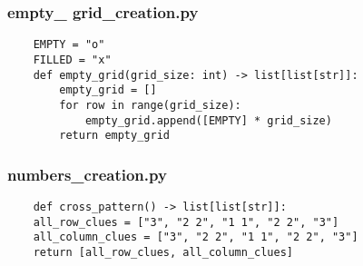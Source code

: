 \documentclass[14pt  aspectratio = 169]{beamer}
\begin{document}

\begin{frame}[fragile]
  \frametitle{empty\_ grid\_creation.py }
  \begin{lstlisting}
    EMPTY = "o"
    FILLED = "x"
    def empty_grid(grid_size: int) -> list[list[str]]:
        empty_grid = []
        for row in range(grid_size):
            empty_grid.append([EMPTY] * grid_size)
        return empty_grid

  \end{lstlisting}

\end{frame}

\begin{frame}[fragile]
  \frametitle{numbers\_creation.py }
  \begin{lstlisting}
    def cross_pattern() -> list[list[str]]:
	all_row_clues = ["3", "2 2", "1 1", "2 2", "3"]
	all_column_clues = ["3", "2 2", "1 1", "2 2", "3"]
	return [all_row_clues, all_column_clues]


  \end{lstlisting}

\end{frame}
\end{document}
